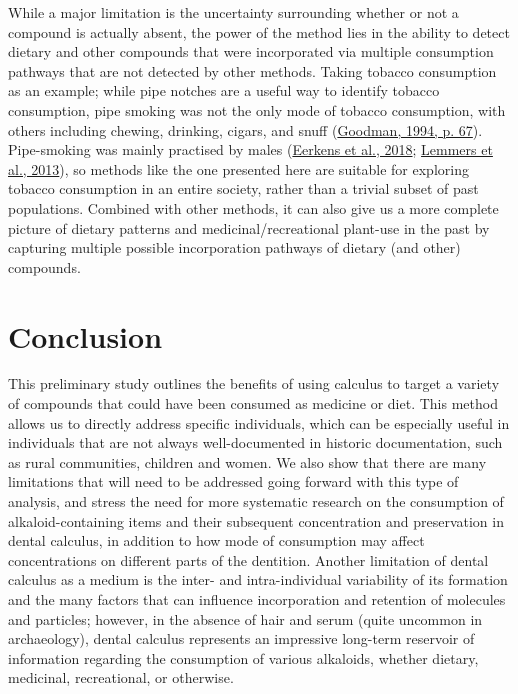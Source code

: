 \documentclass[
  b5paper,
]{book}
\begin{document}
While a major limitation is the uncertainty surrounding whether or not a
compound is actually absent, the power of the method lies in the ability
to detect dietary and other compounds that were incorporated via
multiple consumption pathways that are not detected by other methods.
Taking tobacco consumption as an example; while pipe notches are a
useful way to identify tobacco consumption, pipe smoking was not the
only mode of tobacco consumption, with others including chewing,
drinking, cigars, and snuff
(\protect\hyperlink{ref-goodmanTobaccoHistory1994}{Goodman, 1994, p.
67}). Pipe-smoking was mainly practised by males
(\protect\hyperlink{ref-eerkensDentalCalculus2018}{Eerkens et al.,
2018}; \protect\hyperlink{ref-lemmersMiddenbeemster2013}{Lemmers et al.,
2013}), so methods like the one presented here are suitable for
exploring tobacco consumption in an entire society, rather than a
trivial subset of past populations. Combined with other methods, it can
also give us a more complete picture of dietary patterns and
medicinal/recreational plant-use in the past by capturing multiple
possible incorporation pathways of dietary (and other) compounds.

\hypertarget{conclusion-1}{%
\section{Conclusion}\label{conclusion-1}}

This preliminary study outlines the benefits of using calculus to target
a variety of compounds that could have been consumed as medicine or
diet. This method allows us to directly address specific individuals,
which can be especially useful in individuals that are not always
well-documented in historic documentation, such as rural communities,
children and women. We also show that there are many limitations that
will need to be addressed going forward with this type of analysis, and
stress the need for more systematic research on the consumption of
alkaloid-containing items and their subsequent concentration and
preservation in dental calculus, in addition to how mode of consumption
may affect concentrations on different parts of the dentition. Another
limitation of dental calculus as a medium is the inter- and
intra-individual variability of its formation and the many factors that
can influence incorporation and retention of molecules and particles;
however, in the absence of hair and serum (quite uncommon in
archaeology), dental calculus represents an impressive long-term
reservoir of information regarding the consumption of various alkaloids,
whether dietary, medicinal, recreational, or otherwise.
\end{document}
